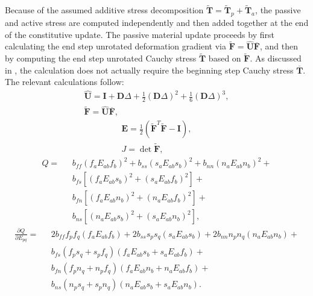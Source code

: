 Because of the assumed additive stress decomposition $\tilde{\bm{T}} = \tilde{\bm{T}}_p + \tilde{\bm{T}}_a$, the passive and active stress are computed independently and then added together at the end of the constitutive update. The passive material update proceeds by first calculating the end step unrotated deformation gradient via $\tilde{\bm{F}} = \hat{\bm{U}}\overline{\bm{F}}$, and then by computing the end step unrotated Cauchy stress $\tilde{\bm{T}}$ based on $\tilde{\bm{F}}$. As discussed in , the calculation does not actually require the beginning step Cauchy stress $\overline{\bm{T}}$. The relevant calculations follow:
\begin{gather}
\hat{\bm{U}} = \bm{I} + \bm{D}\Delta + \frac{1}{2}(\bm{D}\Delta)^2 + \frac{1}{6}(\bm{D}\Delta)^3, \\
\tilde{\bm{F}} = \hat{\bm{U}}\overline{\bm{F}},
\end{gather}
\begin{gather}
\bm{E} = \frac{1}{2}(\tilde{\bm{F}}^T \tilde{\bm{F}} - \bm{I}), \\
J  = \det{\tilde{\bm{F}}},
\end{gather}
\vspace{-5mm}
\begin{equation}
\begin{aligned}
Q =\text{\ } &b_{ff}\left(f_aE_{ab}f_b\right)^2  + b_{ss}\left(s_aE_{ab}s_b\right)^2 + b_{nn}\left(n_aE_{ab}n_b\right)^2 +\\
& b_{fs}\left[\left(f_aE_{ab}s_b\right)^2 + \left(s_aE_{ab}f_b\right)^2\right] +\\
& b_{fn}\left[\left(f_aE_{ab}n_b\right)^2 + \left(n_aE_{ab}f_b\right)^2\right] +\\
& b_{ns}\left[\left(n_aE_{ab}s_b\right)^2 + \left(s_aE_{ab}n_b\right)^2\right],
\end{aligned}
\end{equation}
\begin{equation}
\begin{aligned}
\frac{\partial Q}{\partial E_{pq}} = \text{\ } &2b_{ff}f_pf_q\left(f_aE_{ab}f_b\right) + 2b_{ss}s_ps_q\left(s_aE_{ab}s_b\right) + 2b_{nn}n_pn_q\left(n_aE_{ab}n_b\right) +\\
& b_{fs}\left(f_ps_q + s_pf_q\right)\left(f_aE_{ab}s_b + s_aE_{ab}f_b\right) +\\
& b_{fn}\left(f_pn_q + n_pf_q\right)\left(f_aE_{ab}n_b + n_aE_{ab}f_b\right) +\\
& b_{ns}\left(n_ps_q + s_pn_q\right)\left(n_aE_{ab}s_b + s_aE_{ab}n_b\right).
\end{aligned}
\end{equation}

